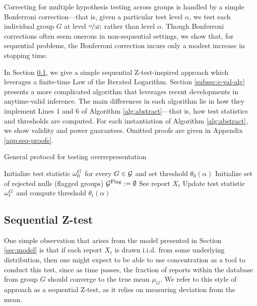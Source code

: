 Correcting for multiple hypothesis testing across groups is handled by a simple Bonferroni correction---that is, given a particular test level $\alpha$, we test each individual group $G$ at level ${\nicefrac{\alpha}{|{\mathcal{G}}|}}$ rather than level $\alpha$.
Though Bonferroni corrections often seem onerous in non-sequential settings, we show that, for sequential problems, the Bonferroni correction incurs only a modest increase in stopping time. 

In Section \ref{subsec:ztest}, we give a simple sequential Z-test-inspired approach which leverages a finite-time Law of the Iterated Logarithm. Section \ref{subsec:e-val-alg} presents a more complicated algorithm that leverages recent developments in anytime-valid inference.
The main differences in each algorithm lie in how they implement Lines 1 and 6 of Algorithm \ref{alg:abstract}---that is, how test statistics and thresholds are computed. 
For each instantiation of Algorithm \ref{alg:abstract}, we show validity and power guarantees.
Omitted proofs are given in Appendix \ref{app:seq-proofs}.


\begin{algorithm2e}
\caption{General protocol for testing overrepresentation}\label{alg:abstract}
\LinesNumbered
{}
Initialize test statistic $\omega_0^G$ for every $G \in {\mathcal{G}}$ and set threshold $\theta_0(\alpha)$\;
Initialize set of rejected nulls (flagged groups) ${\mathcal {G}^{\text{Flag}}} := \emptyset$\;
{
See report $X_t$\;
{   Update test statistic $\omega_t^G$ and compute threshold $\theta_t(\alpha)$\;
    }
}
\end{algorithm2e}

\subsection{Sequential Z-test}
\label{subsec:ztest}
One simple observation that arises from the model presented in Section \ref{sec:model} is that if each report $X_t$ is drawn i.i.d. from some underlying distribution, then one might expect to be able to use concentration as a tool to conduct this test, since as time passes, the fraction of reports within the database from group $G$ should converge to the true mean $\mu_G$. We refer to this style of approach as a sequential Z-test, as it relies on measuring deviation from the mean. 

